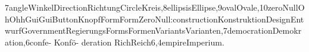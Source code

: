 7angleWinkelDirectionRichtungCircleKreis,8ellipsisEllipse,9ovalOvale,10zeroNullOhOhhGuiGuiButtonKnopfFormFormZeroNull:constructionKonstruktionDesignEntwurfGovernmentRegierungsFormsFormenVariantsVarianten,7democrationDemokration,6confe- Konfö- deration RichReich6,4empireImperium.

